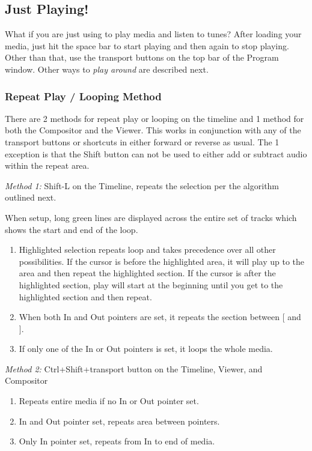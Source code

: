 \subsection{Just Playing!}%
\label{sub:just_playing_}
What if you are just using \CGG{} to play media and listen to tunes? 
After loading your media, just hit the space bar to start playing and then again to stop playing.  
Other than that, use the transport buttons on the top bar of the Program window.  
Other ways to \textit{play around} are described next. 

\subsubsection*{Repeat Play / Looping Method}%
\label{ssub:repeat_play_looping_method}

There are 2 methods for repeat play or looping on the timeline and 1 method for both the Compositor and the Viewer.  This works in conjunction with any of the transport buttons or shortcuts in either forward or reverse as usual.  The 1 exception is that the Shift button can not be used to either add or subtract audio within the repeat area.

\textit{Method 1:} Shift-L on the Timeline, repeats the selection per the algorithm outlined next.
  
When setup, long green lines are displayed across the entire set of tracks which shows the start and end of the loop.
\begin{enumerate}
    \item  Highlighted selection repeats loop and takes precedence over all other possibilities.  
        If the cursor is before the highlighted area, it will play up to the area and then repeat the highlighted section.  
        If the cursor is after the highlighted section, play will start at the beginning until you get to the
        highlighted section and then repeat.
    \item  When both In and Out pointers are set, it repeats the section between [ and ].
    \item  If only one of the In or Out pointers is set, it loops the whole media.
\end{enumerate}

\textit{Method 2:} Ctrl+Shift+transport button on the Timeline, Viewer, and Compositor

\begin{enumerate}
    \item Repeats entire media if no In or Out pointer set.
    \item  In and Out pointer set, repeats area between pointers.
    \item  Only In pointer set, repeats from In to end of media.
\end{enumerate}

